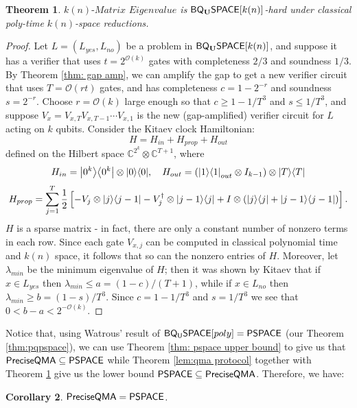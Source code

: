 \documentclass[11pt]{article}
\newtheorem{theorem}{Theorem}
\newtheorem{corollary}[theorem]{Corollary}
\theoremstyle{definition}
\theoremstyle{remark}
\newcommand\BQSPACE{{\sf{BQ_{U}SPACE}}}
\newcommand\PSPACE{{\sf{PSPACE}}}
\newcommand\QMAexp{{\sf{PreciseQMA}}}
\newcommand\spechamiltonian[1]{#1\textit{-Matrix Eigenvalue}}
\newcommand{\classfont}{\sf}
\newcommand{\Unitary}{\mathbf{U}}
\newcommand{\unitaryBQSPACE}[1]{{\classfont{BQ}_\Unitary\classfont{SPACE}}[#1]}
\newcommand\bigoh{\mathcal{O}}
\begin{document}
\begin{theorem}\label{thm: specham-hardness}
$\spechamiltonian{k(n)}$ is $\unitaryBQSPACE{k(n)}$-hard under classical poly-time $k(n)$-space reductions.
\end{theorem}
\begin{proof}
Let $L=(L_{yes},L_{no})$ be a problem in $\unitaryBQSPACE{k(n)}$, and suppose it has a verifier that uses $t=2^{\bigoh(k)}$ gates with completeness $2/3$ and soundness $1/3$. By Theorem \ref{thm: gap amp}, we can   amplify the gap to get a new verifier circuit that uses $T=\mathcal{O}(rt)$ gates, and has completeness $c=1-2^{-r}$ and soundness $s=2^{-r}$. Choose $r=\bigoh(k)$ large enough so that $c \ge 1 - 1/T^3$ and $s \le 1/T^3$, and suppose $V_x=V_{x,T}V_{x,T-1}\cdots V_{x,1}$ is the new (gap-amplified) verifier circuit for $L$ acting on $k$ qubits. Consider the Kitaev clock Hamiltonian:
\begin{equation}
H = H_{in} + H_{prop} + H_{out}
\end{equation}
defined on the Hilbert space $\mathbb{C}^{2^k} \otimes \mathbb{C}^{T+1}$, where
\begin{equation}
H_{in} = {\left\vert{0^k}\right\rangle}{\left\langle{0^k}\right\vert} \otimes {\left\vert{0}\right\rangle}{\left\langle{0}\right\vert}, \quad
H_{out} = ({\left\vert{1}\right\rangle}{\left\langle{1}\right\vert}_{out} \otimes I_{k-1}) \otimes {\left\vert{T}\right\rangle}{\left\langle{T}\right\vert}
\end{equation}
\begin{equation}
H_{prop} = \sum_{j=1}^T \frac{1}{2} \left[ - V_j \otimes {\left\vert{j}\right\rangle}{\left\langle{j-1}\right\vert} - V_j^\dagger \otimes {\left\vert{j-1}\right\rangle}{\left\langle{j}\right\vert} + I \otimes ({\left\vert{j}\right\rangle}{\left\langle{j}\right\vert} + {\left\vert{j-1}\right\rangle}{\left\langle{j-1}\right\vert}) \right].
\end{equation}
$H$ is a sparse matrix - in fact, there are only a constant number of nonzero terms in each row. Since each gate $V_{x,j}$ can be computed in classical polynomial time and $k(n)$ space, it follows that so can the nonzero entries of $H$. Moreover, let $\lambda_{min}$ be the minimum eigenvalue of $H$; then it was shown by Kitaev \cite{ksv02} that if $x \in L_{yes}$ then $\lambda_{min} \le a = (1-c)/(T+1)$, while if $x \in L_{no}$ then $\lambda_{min} \ge b = (1-s)/T^3$. Since $c = 1-1/T^3$ and $s = 1/T^3$ we see that $0 < b-a < 2^{-\mathcal{O}(k)}$. 
\end{proof}
Notice that, using Watrous' result of $\BQSPACE[poly]=\PSPACE$ (our Theorem \ref{thm:pqpspace}), we can use Theorem \ref{thm: pspace upper bound} to give us that $\QMAexp\subseteq\PSPACE$ while Theorem \ref{lem:qma protocol} together with Theorem \ref{thm: specham-hardness} give us the lower bound $\PSPACE\subseteq\QMAexp$.  Therefore, we have:
\begin{corollary} $\QMAexp=\PSPACE$. \end{corollary}
\end{document}
